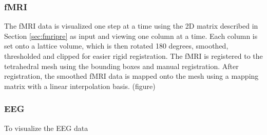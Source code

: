 \subsubsection{fMRI}

The fMRI data is visualized one step at a time using the 2D matrix described in Section \ref{sec:fmripre} as input and viewing one column at a time. Each column is set onto a lattice volume, which is then rotated 180 degrees, smoothed, thresholded and clipped for easier rigid registration. The fMRI is registered to the tetrahedral mesh using the bounding boxes and manual registration. After registration, the smoothed fMRI data is mapped onto the mesh using a mapping matrix with a linear interpolation basis. (figure)

\subsubsection{EEG}

To visualize the EEG data



